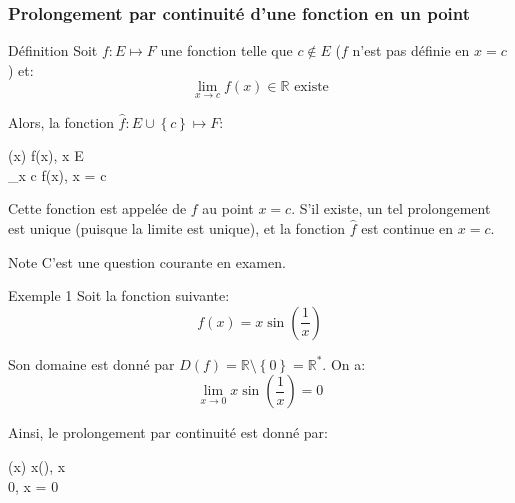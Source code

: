 \documentclass[a4paper]{article}
\begin{document}
\subsubsection{Prolongement par continuité d'une fonction en un point}
\begin{parag}{Définition}
    Soit $f : E \mapsto F$ une fonction telle que $c \not\in E$ ($f$ n'est pas définie en $x = c$) et: 
    \[\lim_{x \to c} f\left(x\right) \in \mathbb{R} \text{ existe}\]
    
    Alors, la fonction $\hat{f} : E \cup \left\{c\right\} \mapsto F$: 
    \begin{functionbypart}{\left(x\right)}
        f\left(x\right), \mathspace x \in E \\
        \lim\limits_{x \to c} f\left(x\right), \mathspace x = c
    \end{functionbypart}

    Cette fonction est appelée  de $f$ au point $x = c$. S'il existe, un tel prolongement est unique (puisque la limite est unique), et la fonction $\hat{f}$ est continue en $x = c$.

    \begin{subparag}{Note}
        C'est une question courante en examen.
    \end{subparag}
    
\end{parag}

\begin{parag}{Exemple 1}
    Soit la fonction suivante: 
    \[f\left(x\right) = x\sin\left(\frac{1}{x}\right)\]
    
    Son domaine est donné par $D\left(f\right) = \mathbb{R} \setminus \left\{0\right\} = \mathbb{R}^*$. On a: 
    \[\lim_{x \to 0} x \sin\left(\frac{1}{x}\right) = 0\]

    Ainsi, le prolongement par continuité est donné par: 
    \begin{functionbypart}{\left(x\right)}
        x\sin\left(\right), \mathspace x  \\
        0, \mathspace x = 0
    \end{functionbypart}
\end{parag}
\end{document}
